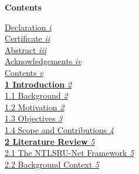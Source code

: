 \documentclass[12pt,a4paper]{report}
\begin{document}
\newpage
\thispagestyle{plain}

\begin{center}
    \hypertarget{sec:toc}{}%
    {\Large \textbf{Contents}}\\[0.5cm]
\end{center}

\setlength{\parindent}{0pt}
\setlength{\parskip}{3pt}
\justifying

\noindent \hyperlink{sec:declaration}{Declaration \dotfill \textit{i}}\\
\hyperlink{sec:certificate}{Certificate \dotfill \textit{ii}}\\
\hyperlink{sec:abstract}{Abstract \dotfill \textit{iii}}\\
\hyperlink{sec:ack}{Acknowledgements \dotfill \textit{iv}}\\
\hyperlink{sec:toc}{Contents \dotfill \textit{v}}\\[0.5cm]

\hyperlink{sec:ch1}{\textbf{1 \hspace{0.3cm} Introduction} \dotfill \textit{2}}\\
\hspace*{0.8cm}\hyperlink{sec:s11}{1.1 \hspace{0.3cm} Background \dotfill \textit{2}}\\
\hspace*{0.8cm}\hyperlink{sec:s12}{1.2 \hspace{0.3cm} Motivation \dotfill \textit{2}}\\
\hspace*{0.8cm}\hyperlink{sec:s13}{1.3 \hspace{0.3cm} Objectives \dotfill \textit{3}}\\
\hspace*{0.8cm}\hyperlink{sec:s14}{1.4 \hspace{0.3cm} Scope and Contributions \dotfill \textit{4}}\\[0.3cm]

\hyperlink{sec:ch2}{\textbf{2 \hspace{0.3cm} Literature Review} \dotfill \textit{5}}\\
\hspace*{0.8cm}\hyperlink{sec:s21}{2.1 \hspace{0.3cm} The NTLSRU-Net Framework \dotfill \textit{5}}\\
\hspace*{0.8cm}\hyperlink{sec:s22}{2.2 \hspace{0.3cm} Background Context \dotfill \textit{5}}\\[0.3cm]
\end{document}
